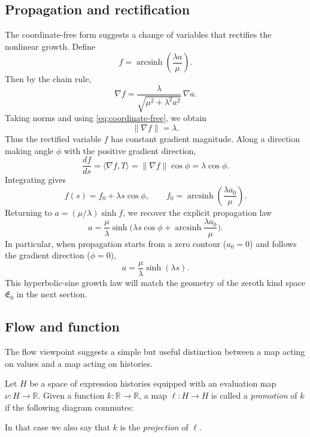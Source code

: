 \subsection{Propagation and rectification}\label{subsec:propagation}\label{subsec:propagation-method}

The coordinate-free form suggests a change of variables that rectifies the nonlinear growth. Define
\[
f = \operatorname{arcsinh}\left(\frac{\lambda a}{\mu}\right).
\]
Then by the chain rule,
\[
\nabla f
= \frac{\lambda}{\sqrt{\mu^2+\lambda^2 a^2}}\,\nabla a.
\]
Taking norms and using \eqref{eq:coordinate-free}, we obtain
\[
\|\nabla f\| = \lambda.
\]
Thus the rectified variable $f$ has constant gradient magnitude. Along a direction making angle $\phi$ with the positive gradient direction,
\[
\frac{df}{ds} = \langle \nabla f, T\rangle = \|\nabla f\|\cos\phi = \lambda\cos\phi.
\]
Integrating gives
\[
f(s) = f_0 + \lambda s\cos\phi,
\qquad
f_0 = \operatorname{arcsinh}\left(\frac{\lambda a_0}{\mu}\right).
\]
Returning to $a = (\mu/\lambda)\sinh f$, we recover the explicit propagation law
\begin{equation}\label{eq:gradevo4}
a=\frac{\mu}{\lambda}\sinh\!\Big(\lambda s\cos\phi+\operatorname{arcsinh}\frac{\lambda a_0}{\mu}\Big).
\end{equation}
In particular, when propagation starts from a zero contour ($a_0=0$) and follows the gradient direction ($\phi=0$),
\[
    a = \frac{\mu}{\lambda}\sinh(\lambda s).
\]
This hyperbolic-sine growth law will match the geometry of the zeroth kind space $\mathfrak{E}_0$ in the next section.

\subsection{Flow and function}\label{subsec:flow-and-function}

The flow viewpoint suggests a simple but useful distinction between a map acting on values and a map acting on histories.

\begin{definition}\label{def:projection}
Let $H$ be a space of expression histories equipped with an evaluation map $\nu:H\to\mathbb{R}$. Given a function $k:\mathbb{R}\to\mathbb{R}$, a map $\ell:H\to H$ is called a \emph{promotion} of $k$ if the following diagram commutes:

\begin{center}
\end{center}

In that case we also say that $k$ is the \emph{projection} of $\ell$.
\end{definition}

